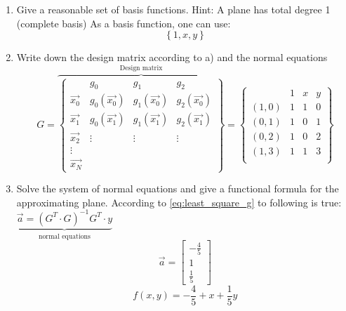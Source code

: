 \begin{enumerate}[label=(\alph*)]
    \item Give a reasonable set of basis functions. Hint: A plane has total degree 1 (complete basis) \newline\newline
    As a basis function, one can use:
    $$
\left\{1,x,y\right\}
$$


    \item Write down the design matrix according to a) and the normal equations
$$
G=
\overbrace{\left\{\begin{array}{c|ccc}
 & g_0 & g_1 & g_2 \\
\hline 
\vec{x_0} & g_0\left(\vec{x_0}\right) & g_1\left(\vec{x_0}\right) & g_2\left(\vec{x_0}\right) \\
\vec{x_1} & g_0\left(\vec{x_1}\right) & g_1\left(\vec{x_1}\right) & g_2\left(\vec{x_1}\right)\\
\vec{x_2} &\vdots&\vdots&\vdots \\
\vdots   &  \\
\vec{x_N} &  
\end{array}\right\}}^{\text{Design matrix}}=
\left\{\begin{array}{c|ccc}
 & 1 & x & y\\
\hline 
(1,0) & 1 & 1 & 0\\
(0,1) & 1 & 0 & 1\\
(0,2) & 1 & 0 & 2\\
(1,3) & 1 & 1 & 3\\
\end{array}\right\}
$$
    \item Solve the system of normal equations and give a functional formula for the
approximating plane.\newline\newline
According to \autoref{eq:least_square_g} to following is true: $\underbrace{\vec{a}=\left(G^T\cdot G\right)^{-1}G^T\cdot y}_{\text{normal equations}}$
$$
\vec{a}=
\left[\begin{array}{ccc}
-\frac{4}{5} \\
1 \\
\frac{1}{5} 
\end{array}\right]
$$
$$
f(x,y)=-\frac{4}{5}+x+\frac{1}{5}y
$$
\end{enumerate}
